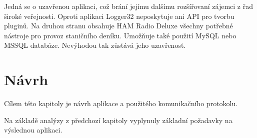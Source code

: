 Jedná se o uzavřenou aplikaci, což brání jejímu dalšímu rozšířovaní zájemci z
řad široké veřejnosti. Oproti aplikaci
Logger32 neposkytuje ani API pro tvorbu pluginů. Na druhou stranu obsahuje HAM Radio Deluxe všechny
potřebné nástroje pro provoz staničního deníku. Umožňuje také použití MySQL nebo MSSQL databáze.
Nevýhodou tak zůstává jeho uzavřenost.


\chapter{Návrh}
\label{navrh}

Cílem této kapitoly je návrh aplikace a použitého komunikačního protokolu.

Na základě analýzy z předchozí kapitoly vyplynuly základní požadavky
na výslednou aplikaci.


